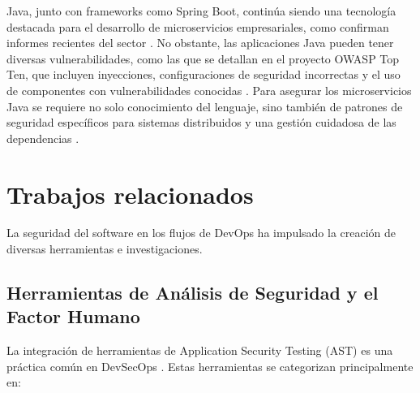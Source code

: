 Java, junto con frameworks como Spring Boot, continúa siendo una tecnología destacada para el desarrollo de microservicios empresariales, como confirman informes recientes del sector \cite{Snyk2024JVMEcosystem}. No obstante, las aplicaciones Java pueden tener diversas vulnerabilidades, como las que se detallan en el proyecto OWASP Top Ten, que incluyen inyecciones, configuraciones de seguridad incorrectas y el uso de componentes con vulnerabilidades conocidas \cite{OWASP2021TopTen}. Para asegurar los microservicios Java se requiere no solo conocimiento del lenguaje, sino también de patrones de seguridad específicos para sistemas distribuidos y una gestión cuidadosa de las dependencias \cite{FiniteState2023JavaVulnerabilities}.

\section{Trabajos relacionados}\label{sec:trabajos_relacionados}
La seguridad del software en los flujos de DevOps ha impulsado la creación de diversas herramientas e investigaciones.

\subsection{Herramientas de Análisis de Seguridad y el Factor Humano}
La integración de herramientas de Application Security Testing (AST) es una práctica común en DevSecOps \cite{Kumar2022DevSecOpsReview}. Estas herramientas se categorizan principalmente en:

